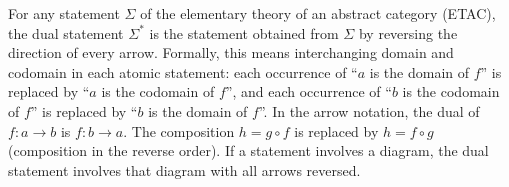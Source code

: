 For any statement $\Sigma$ of the elementary theory of an abstract category (ETAC), the dual statement $\Sigma^{*}$ is the statement obtained from $\Sigma$ by reversing the direction of every arrow. Formally, this means interchanging domain and codomain in each atomic statement: each occurrence of ``$a$ is the domain of $f$'' is replaced by ``$a$ is the codomain of $f$'', and each occurrence of ``$b$ is the codomain of $f$'' is replaced by ``$b$ is the domain of $f$''. In the arrow notation, the dual of $f: a \to b$ is $f: b \to a$. The composition $h = g \circ f$ is replaced by $h = f \circ g$ (composition in the reverse order). If a statement involves a diagram, the dual statement involves that diagram with all arrows reversed.
